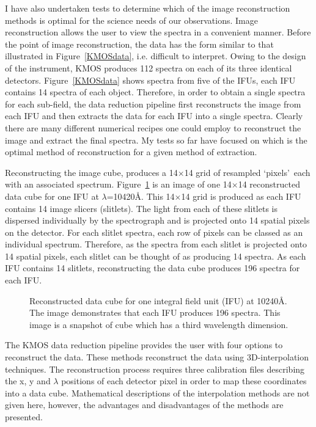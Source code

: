 \documentclass[a4paper,12pt]{article}
\begin{document}
I have also undertaken tests to determine which of the image reconstruction methods is optimal for the science needs of our observations. 
Image reconstruction allows the user to view the spectra in a convenient manner. 
Before the point of image reconstruction, the data has the form similar to that illustrated in Figure~\ref{KMOSdata}, i.e. difficult to interpret. 
Owing to the design of the instrument, KMOS produces 112 spectra on each of its three identical detectors. 
Figure~\ref{KMOSdata} shows spectra from five of the IFUs, each IFU contains 14 spectra of each object.
Therefore, in order to obtain a single spectra for each sub-field, the data reduction pipeline first reconstructs the image from each IFU and then extracts the data for each IFU into a single spectra. 
Clearly there are many different numerical recipes one could employ to reconstruct the image and extract the final spectra.
My tests so far have focused on which is the optimal method of reconstruction for a given method of extraction. 

Reconstructing the image cube, produces a 14$\times$14 grid of resampled \textquoteleft pixels\textquoteright ~each with an associated spectrum. 
Figure~\ref{KMOScube} is an image of one 14$\times$14 reconstructed data cube for one IFU at $\lambda$=10420\AA.
This 14$\times$14 grid is produced as each IFU contains 14 image slicers (slitlets). 
The light from each of these slitlets is dispersed individually by the spectrograph and is projected onto 14 spatial pixels on the detector. 
For each slitlet spectra, each row of pixels can be classed as an individual spectrum. 
Therefore, as the spectra from each slitlet is projected onto 14 spatial pixels, each slitlet can be thought of as producing 14 spectra. 
As each IFU contains 14 slitlets, reconstructing the data cube produces 196 spectra for each IFU. 
\begin{figure}     %
        \begin{center}
          \epsfxsize=80mm         %
\end{center}
\caption{Reconstructed data cube for one integral field unit (IFU) at 10240\AA. 
The image demonstrates that each IFU produces 196 spectra.
This image is a snapshot of cube which has a third wavelength dimension.}
\label{KMOScube}                 %
\end{figure}

The KMOS data reduction pipeline provides the user with four options to reconstruct the data.
These methods reconstruct the data using 3D-interpolation techniques.
The reconstruction process requires three calibration files describing the x, y and $\lambda$ positions of each detector pixel in order to map these coordinates into a data cube.
Mathematical descriptions of the interpolation methods are not given here, however, the advantages and disadvantages of the methods are presented.
\end{document}

